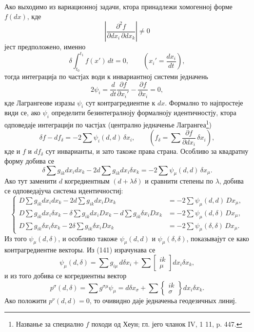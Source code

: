 ﻿\documentclass[11pt]{article}
\begin{document}
Ако выходимо из вариационној задачи, ктора принадлежи хомогенној форме $f(dx)$, кде
\[
\left|\frac{\partial^2 f}{\partial dx_i\,\partial dx_k}\right|\ne0
\]
јест предположено, именно
\begin{equation}
 \delta\int_{t_0}^{t_1} f(x')\,dt=0,
 \qquad \left(x_i'=\frac{dx_i}{dt}\right),
\tag{140}
\end{equation}
тогда интеграција по частјах води к инвариантној системи једначень
\[
 2\psi_i=\frac{d}{dt}\frac{\partial f}{\partial x_i'}-\frac{\partial f}{\partial x_i}=0,
\]
кде Лагрангеове изразы $\psi_i$ сут контрагредиентне к $dx$. Формално то најпростеје види се, ако $\psi_i$ определити безинтегралноју формалноју идентичностју, ктора одповедаје интеграцији по частјах (централно једначенье Лагрангеа\footnote{Названье за специално $f$ походи од Хеун; гл. јего чланок IV, 1 11, p. 447.})
\[
 \delta f-df_\delta=-2\sum\psi_i(d,d)\,\delta x_i,
 \qquad
 \left(f_\delta=\sum\frac{\partial f}{\partial dx_i}\,\delta x_i\right),
\]
кде и $f$ и $df_\delta$ сут инварианты, и зато такоже права страна. Особливо за квадратну форму добива се
\[
 \delta\sum g_{ik}dx_i dx_k-2d\sum g_{ik}dx_i\delta x_k
 =-2\sum\psi_\mu(d,d)\,\delta x_\mu.
\]
Ако тут заменити $d$ когредиентным $(d+\lambda\delta)$ и сравнити степены по $\lambda$, добива се одповедајуча система идентичностиј:
\begin{equation}
\left\{
\begin{aligned}
D\sum g_{ik}dx_i dx_k-2d\sum g_{ik}dx_iDx_k
   &=-2\sum\psi_\mu(d,d)\,Dx_\mu,\\
D\sum g_{ik}dx_i\delta x_k-\delta\sum g_{ik}dx_iDx_k
   -d\sum g_{ik}\delta x_iDx_k
   &=-2\sum\psi_\mu(d,\delta)\,Dx_\mu,\\
D\sum g_{ik}\delta x_i\delta x_k-2\delta\sum g_{ik}\delta x_iDx_k
   &=-2\sum\psi_\mu(\delta,\delta)\,Dx_\mu.
\end{aligned}
\right.
\tag{141}
\end{equation}
Из того $\psi_\mu(d,\delta)$, и особливо такоже $\psi_\mu(d,d)$ и $\psi_\mu(\delta,\delta)$, показывајут се како контрагредиентне векторы. Из (141) израчунава се
\[
 \psi_\mu(d,\delta)=\sum g_{i\mu}\,d\delta x_i+
 \sum\left[\begin{smallmatrix}ik\\ \mu\end{smallmatrix}\right]dx_i\delta x_k,
\]
и из того добива се когредиентны вектор
\begin{equation}
 p^\sigma(d,\delta)=\sum g^{\sigma\mu}\psi_\mu
 =d\delta x_\sigma+
 \sum\left\{\begin{smallmatrix}ik\\ \sigma\end{smallmatrix}\right\}dx_i\delta x_k.
\tag{142}
\end{equation}
Ако положити $p^\nu(d,d)=0$, то очивидно даје једначеньа геодезичных линиј.
\end{document}
